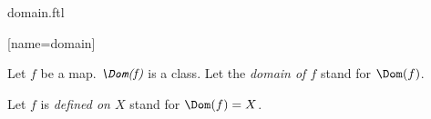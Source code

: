 \documentclass{stex}
\begin{document}
\begin{smodule}{domain.ftl}


[name=domain]{}


\begin{fakeforthel}
  \begin{signature}[for=Dom]
    Let $f$ be a map.
    $\emph{\Dom(f)}$ is a class.
    Let the \emph{domain of $f$} stand for $\Dom(f)$.
  \end{signature}
\end{fakeforthel}

\begin{forthel}
  \begin{convention}[for=defined]
    Let $f$ is \emph{defined on $X$} stand for $\Dom(f) = X$.
  \end{convention}
\end{forthel}

\end{smodule}
\end{document}
